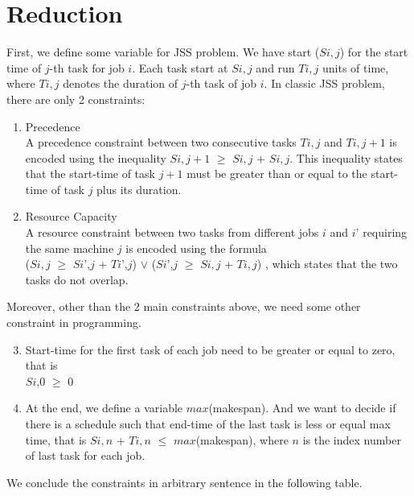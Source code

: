 \section*{Reduction}
First, we define some variable for JSS problem. We have start ($S${\scriptsize$i,j$}) for the start time of $j$-th task for job $i$.  Each task start at $S${\scriptsize$i,j$} and run $T${\scriptsize$i,j$} units of time, where $T${\scriptsize$i,j$} denotes the duration of $j$-th task of job $i$. In classic JSS problem, there are only 2 constraints:

\begin{enumerate}
 \item Precedence \\
A precedence constraint between two consecutive tasks $T${\scriptsize$i,j$} and $T${\scriptsize$i,j+1$} is encoded using
the inequality $S${\scriptsize$i,j+1$} $\geq$ $S${\scriptsize$i,j$} + $S${\scriptsize$i,j$}. This inequality states that the start-time of task $j+1$ must be greater than or equal to the start-time of task $j$ plus its duration.


\item Resource Capacity \\
 A resource constraint between two tasks from different jobs $i$ and $i$' requiring the same machine $j$ is encoded using the formula \\
 ($S${\scriptsize$i,j$} $\geq$ $S${\scriptsize$i$',$j$} + $T${\scriptsize$i$',$j$}) $\vee$ ($S${\scriptsize$i$',$j$} $\geq$ $S${\scriptsize$i,j$} + $T${\scriptsize$i,j$}) , which states that the two tasks do not overlap. 


\end{enumerate}
Moreover, other than the 2 main constraints above, we need some other constraint in programming.

\begin{enumerate}
\setcounter{enumi}{2}
 \item  Start-time for the first task of each job need to be greater or equal to zero,
 that is\\ $S${\scriptsize$i$,0} $\geq$ 0



\item At the end, we define a variable $max$(makespan). And we want to decide if there is a schedule such that end-time of the last task is less or equal max time, that is $S${\scriptsize$i,n$} + $T${\scriptsize$i,n$} $\leq$ $max$(makespan), where $n$ is the index number of last task for each job.




\end{enumerate}
We conclude the constraints in arbitrary sentence in the following table. 

